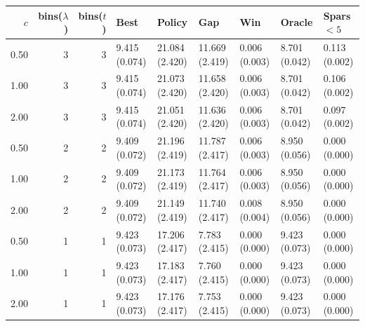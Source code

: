 \begin{tabular}{rrrllllll}
\toprule
$c$ & bins($\lambda$) & bins($t$) & Best & Policy & Gap & Win & Oracle & Spars$<5$ \\
\midrule
0.50 & 3 & 3 & 9.415 (0.074) & 21.084 (2.420) & 11.669 (2.419) & 0.006 (0.003) & 8.701 (0.042) & 0.113 (0.002) \\
1.00 & 3 & 3 & 9.415 (0.074) & 21.073 (2.420) & 11.658 (2.420) & 0.006 (0.003) & 8.701 (0.042) & 0.106 (0.002) \\
2.00 & 3 & 3 & 9.415 (0.074) & 21.051 (2.420) & 11.636 (2.420) & 0.006 (0.003) & 8.701 (0.042) & 0.097 (0.002) \\
0.50 & 2 & 2 & 9.409 (0.072) & 21.196 (2.419) & 11.787 (2.417) & 0.006 (0.003) & 8.950 (0.056) & 0.000 (0.000) \\
1.00 & 2 & 2 & 9.409 (0.072) & 21.173 (2.419) & 11.764 (2.417) & 0.006 (0.003) & 8.950 (0.056) & 0.000 (0.000) \\
2.00 & 2 & 2 & 9.409 (0.072) & 21.149 (2.419) & 11.740 (2.417) & 0.008 (0.004) & 8.950 (0.056) & 0.000 (0.000) \\
0.50 & 1 & 1 & 9.423 (0.073) & 17.206 (2.417) & 7.783 (2.415) & 0.000 (0.000) & 9.423 (0.073) & 0.000 (0.000) \\
1.00 & 1 & 1 & 9.423 (0.073) & 17.183 (2.417) & 7.760 (2.415) & 0.000 (0.000) & 9.423 (0.073) & 0.000 (0.000) \\
2.00 & 1 & 1 & 9.423 (0.073) & 17.176 (2.417) & 7.753 (2.415) & 0.000 (0.000) & 9.423 (0.073) & 0.000 (0.000) \\
\bottomrule
\end{tabular}
